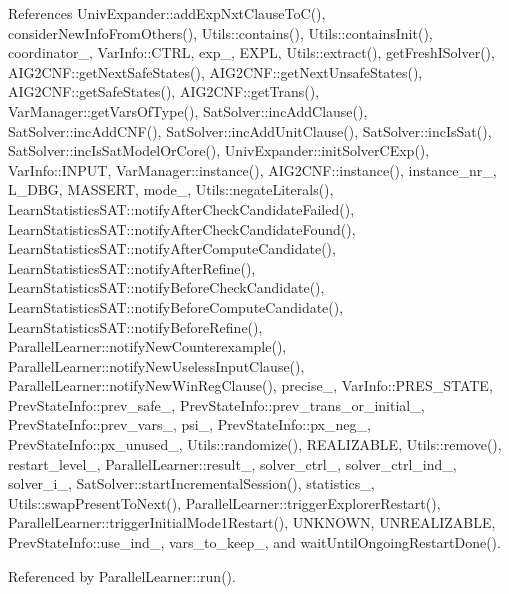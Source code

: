 References Univ\-Expander\-::add\-Exp\-Nxt\-Clause\-To\-C(), consider\-New\-Info\-From\-Others(), Utils\-::contains(), Utils\-::contains\-Init(), coordinator\-\_\-, Var\-Info\-::\-C\-T\-R\-L, exp\-\_\-, E\-X\-P\-L, Utils\-::extract(), get\-Fresh\-I\-Solver(), A\-I\-G2\-C\-N\-F\-::get\-Next\-Safe\-States(), A\-I\-G2\-C\-N\-F\-::get\-Next\-Unsafe\-States(), A\-I\-G2\-C\-N\-F\-::get\-Safe\-States(), A\-I\-G2\-C\-N\-F\-::get\-Trans(), Var\-Manager\-::get\-Vars\-Of\-Type(), Sat\-Solver\-::inc\-Add\-Clause(), Sat\-Solver\-::inc\-Add\-C\-N\-F(), Sat\-Solver\-::inc\-Add\-Unit\-Clause(), Sat\-Solver\-::inc\-Is\-Sat(), Sat\-Solver\-::inc\-Is\-Sat\-Model\-Or\-Core(), Univ\-Expander\-::init\-Solver\-C\-Exp(), Var\-Info\-::\-I\-N\-P\-U\-T, Var\-Manager\-::instance(), A\-I\-G2\-C\-N\-F\-::instance(), instance\-\_\-nr\-\_\-, L\-\_\-\-D\-B\-G, M\-A\-S\-S\-E\-R\-T, mode\-\_\-, Utils\-::negate\-Literals(), Learn\-Statistics\-S\-A\-T\-::notify\-After\-Check\-Candidate\-Failed(), Learn\-Statistics\-S\-A\-T\-::notify\-After\-Check\-Candidate\-Found(), Learn\-Statistics\-S\-A\-T\-::notify\-After\-Compute\-Candidate(), Learn\-Statistics\-S\-A\-T\-::notify\-After\-Refine(), Learn\-Statistics\-S\-A\-T\-::notify\-Before\-Check\-Candidate(), Learn\-Statistics\-S\-A\-T\-::notify\-Before\-Compute\-Candidate(), Learn\-Statistics\-S\-A\-T\-::notify\-Before\-Refine(), Parallel\-Learner\-::notify\-New\-Counterexample(), Parallel\-Learner\-::notify\-New\-Useless\-Input\-Clause(), Parallel\-Learner\-::notify\-New\-Win\-Reg\-Clause(), precise\-\_\-, Var\-Info\-::\-P\-R\-E\-S\-\_\-\-S\-T\-A\-T\-E, Prev\-State\-Info\-::prev\-\_\-safe\-\_\-, Prev\-State\-Info\-::prev\-\_\-trans\-\_\-or\-\_\-initial\-\_\-, Prev\-State\-Info\-::prev\-\_\-vars\-\_\-, psi\-\_\-, Prev\-State\-Info\-::px\-\_\-neg\-\_\-, Prev\-State\-Info\-::px\-\_\-unused\-\_\-, Utils\-::randomize(), R\-E\-A\-L\-I\-Z\-A\-B\-L\-E, Utils\-::remove(), restart\-\_\-level\-\_\-, Parallel\-Learner\-::result\-\_\-, solver\-\_\-ctrl\-\_\-, solver\-\_\-ctrl\-\_\-ind\-\_\-, solver\-\_\-i\-\_\-, Sat\-Solver\-::start\-Incremental\-Session(), statistics\-\_\-, Utils\-::swap\-Present\-To\-Next(), Parallel\-Learner\-::trigger\-Explorer\-Restart(), Parallel\-Learner\-::trigger\-Initial\-Mode1\-Restart(), U\-N\-K\-N\-O\-W\-N, U\-N\-R\-E\-A\-L\-I\-Z\-A\-B\-L\-E, Prev\-State\-Info\-::use\-\_\-ind\-\_\-, vars\-\_\-to\-\_\-keep\-\_\-, and wait\-Until\-Ongoing\-Restart\-Done().



Referenced by Parallel\-Learner\-::run().

